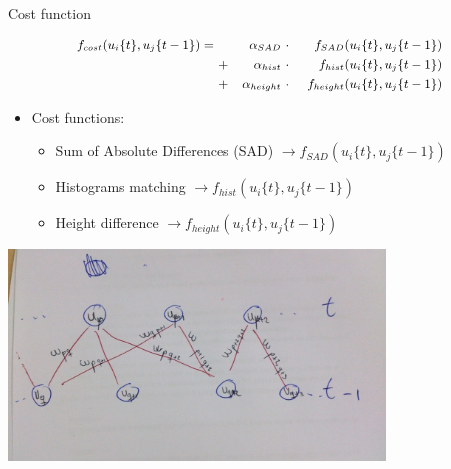 \begin{frame}{Cost function}
  \begin{overlayarea}{\textwidth}{0.5\textheight}
   {
  \begin{equation}
    \nonumber \small
    \begin{align*}
    f_{cost}(u_i\{t\}, u_j\{t - 1\}) =~  & & \alpha_{SAD} & ~\cdot~ & f_{SAD}(u_i\{t\}, u_j\{t - 1\}) \\
	& + & \alpha_{hist} & ~\cdot~ & f_{hist}(u_i\{t\}, u_j\{t - 1\}) \\
	& + & \alpha_{height} & ~\cdot~ & f_{height}(u_i\{t\}, u_j\{t - 1\})
    \end{align*}
  \end{equation}
  
  \begin{itemize}
   \item Cost functions:
    \begin{itemize}
      \item Sum of Absolute Differences (SAD) $\rightarrow f_{SAD}(u_i\{t\}, u_j\{t - 1\})$
      \item Histograms matching $\rightarrow f_{hist}(u_i\{t\}, u_j\{t - 1\})$
      \item Height difference $\rightarrow f_{height}(u_i\{t\}, u_j\{t - 1\})$
    \end{itemize}
  \end{itemize}
  }
  \end{overlayarea}
  
  \begin{center}
    \includegraphics[width=0.75\textwidth]{bipartite_graph}
  \end{center}
  

\end{frame}
